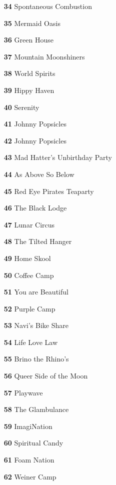 \begin{multicols}{2}
\begin{itemize}[itemsep=.0125mm,parsep=2pt]
	\item[\textbf{34}] Spontaneous Combustion
	\item[\textbf{35}] Mermaid Oasis
	\item[\textbf{36}] Green House
	\item[\textbf{37}] Mountain Moonshiners
	\item[\textbf{38}] World Spirits
	\item[\textbf{39}] Hippy Haven
	\item[\textbf{40}] Serenity
	\item[\textbf{41}] Johnny Popsicles
	\item[\textbf{42}] Johnny Popsicles
	\item[\textbf{43}] Mad Hatter's Unbirthday Party
	\item[\textbf{44}] As Above So Below
	\item[\textbf{45}] Red Eye Pirates Teaparty
	\item[\textbf{46}] The Black Lodge
	\item[\textbf{47}] Lunar Circus
	\item[\textbf{48}] The Tilted Hanger
	\item[\textbf{49}] Home Skool
	\item[\textbf{50}] Coffee Camp
	\item[\textbf{51}] You are Beautiful
	\item[\textbf{52}] Purple Camp
	\item[\textbf{53}] Navi's Bike Share
	\item[\textbf{54}] Life Love Law
	\item[\textbf{55}] Brino the Rhino's
	\item[\textbf{56}] Queer Side of the Moon
	\item[\textbf{57}] Playwave
	\item[\textbf{58}] The Glambulance
	\item[\textbf{59}] ImagiNation
	\item[\textbf{60}] Spiritual Candy
	\item[\textbf{61}] Foam Nation
	\item[\textbf{62}] Weiner Camp

\end{itemize}
\end{multicols}



